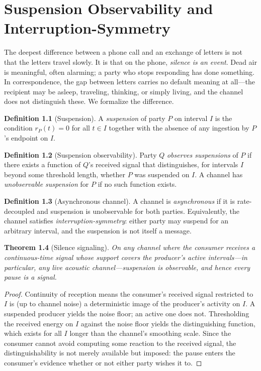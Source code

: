 \documentclass[11pt,oneside]{book}
\theoremstyle{plain}
\newtheorem{theorem}{Theorem}[chapter]
\theoremstyle{definition}
\newtheorem{definition}[theorem]{Definition}
\theoremstyle{remark}
\begin{document}
\chapter{Suspension Observability and Interruption-Symmetry}

The deepest difference between a phone call and an exchange of letters is not that the letters travel slowly. It is that on the phone, \emph{silence is an event}. Dead air is meaningful, often alarming; a party who stops responding has done something. In correspondence, the gap between letters carries no default meaning at all---the recipient may be asleep, traveling, thinking, or simply living, and the channel does not distinguish these. We formalize the difference.

\begin{definition}[Suspension]
A \emph{suspension} of party $P$ on interval $I$ is the condition $r_P(t) = 0$ for all $t \in I$ together with the absence of any ingestion by $P$'s endpoint on $I$.
\end{definition}

\begin{definition}[Suspension observability]
Party $Q$ \emph{observes suspensions} of $P$ if there exists a function of $Q$'s received signal that distinguishes, for intervals $I$ beyond some threshold length, whether $P$ was suspended on $I$. A channel has \emph{unobservable suspension} for $P$ if no such function exists.
\end{definition}

\begin{definition}[Asynchronous channel]
A channel is \emph{asynchronous} if it is rate-decoupled and suspension is unobservable for both parties. Equivalently, the channel satisfies \emph{interruption-symmetry}: either party may suspend for an arbitrary interval, and the suspension is not itself a message.
\end{definition}

\begin{theorem}[Silence signaling]
On any channel where the consumer receives a continuous-time signal whose support covers the producer's active intervals---in particular, any live acoustic channel---suspension is observable, and hence every pause is a signal.
\end{theorem}

\begin{proof}
Continuity of reception means the consumer's received signal restricted to $I$ is (up to channel noise) a deterministic image of the producer's activity on $I$. A suspended producer yields the noise floor; an active one does not. Thresholding the received energy on $I$ against the noise floor yields the distinguishing function, which exists for all $I$ longer than the channel's smoothing scale. Since the consumer cannot avoid computing some reaction to the received signal, the distinguishability is not merely available but imposed: the pause enters the consumer's evidence whether or not either party wishes it to.
\end{proof}
\end{document}
